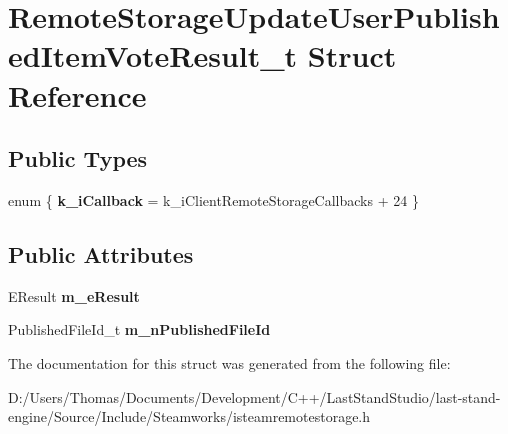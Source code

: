 \hypertarget{structRemoteStorageUpdateUserPublishedItemVoteResult__t}{}\section{Remote\+Storage\+Update\+User\+Published\+Item\+Vote\+Result\+\_\+t Struct Reference}
\label{structRemoteStorageUpdateUserPublishedItemVoteResult__t}
\subsection*{Public Types}
\begin{DoxyCompactItemize}
\item 
\hypertarget{structRemoteStorageUpdateUserPublishedItemVoteResult__t_a76bec2aeeff69b3eb2075c0f10788a08}{}enum \{ {\bfseries k\+\_\+i\+Callback} = k\+\_\+i\+Client\+Remote\+Storage\+Callbacks + 24
 \}\label{structRemoteStorageUpdateUserPublishedItemVoteResult__t_a76bec2aeeff69b3eb2075c0f10788a08}

\end{DoxyCompactItemize}
\subsection*{Public Attributes}
\begin{DoxyCompactItemize}
\item 
\hypertarget{structRemoteStorageUpdateUserPublishedItemVoteResult__t_a5227b3814b144419bf842ee9173a2dcb}{}E\+Result {\bfseries m\+\_\+e\+Result}\label{structRemoteStorageUpdateUserPublishedItemVoteResult__t_a5227b3814b144419bf842ee9173a2dcb}

\item 
\hypertarget{structRemoteStorageUpdateUserPublishedItemVoteResult__t_a46ffef785358113d23bb249a90576f12}{}Published\+File\+Id\+\_\+t {\bfseries m\+\_\+n\+Published\+File\+Id}\label{structRemoteStorageUpdateUserPublishedItemVoteResult__t_a46ffef785358113d23bb249a90576f12}

\end{DoxyCompactItemize}


The documentation for this struct was generated from the following file\+:\begin{DoxyCompactItemize}
\item 
D\+:/\+Users/\+Thomas/\+Documents/\+Development/\+C++/\+Last\+Stand\+Studio/last-\/stand-\/engine/\+Source/\+Include/\+Steamworks/isteamremotestorage.\+h\end{DoxyCompactItemize}
